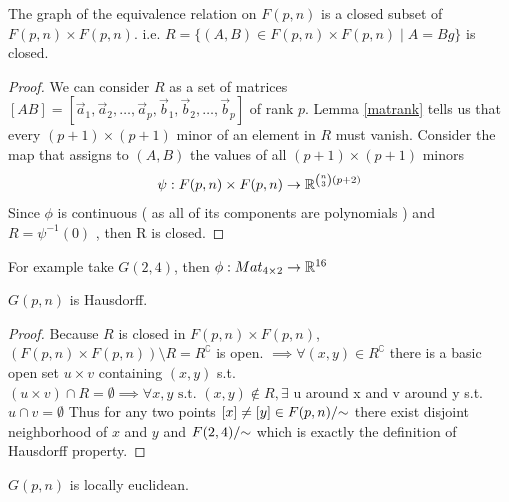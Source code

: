 \documentclass[11pt,a4paper]{report}
\begin{document}
\begin{Prop}
The graph of the equivalence relation on $F(p,n)$ is a closed subset of $F(p,n) \times F(p,n)$. i.e. $ R = \{ (A,B) \in F(p,n) \times F(p,n) \; | \; A = Bg \}$ is closed.
\end{Prop}
\begin{proof}
We can consider $R$ as a set of matrices $[A B] = [\vec{a}_1, \vec{a}_2, \dots, \vec{a}_p, \vec{b}_1, \vec{b}_2, \dots , \vec{b}_p]$ of rank $p$.
Lemma \ref{matrank} tells us that every $(p+1) \times (p+1) $ minor of an element in $R$ must vanish. Consider the map that assigns to $(A,B)$ the values of all $ (p+1) \times (p+1) $ minors
$$ \psi:  F(p,n) \times F(p,n) \to \mathbb{R}^{ {n \choose 3} (p+2) }$$
Since $\phi$ is continuous ( as all of its components are polynomials )  and $R = \psi^{-1} (0) $ , then R is closed.
\end{proof}
\begin{Ex}
    For example take $G(2,4)$, then $\phi: Mat_{4 \times 2} \to \mathbb{R}^{16}$ 
\end{Ex}
\begin{Prop}\label{HausP}
$G(p,n)$ is Hausdorff.
\end{Prop}
\begin{proof}
Because $R$ is closed in $F(p,n) \times F(p,n)$, $(F(p,n) \times F(p,n)) \setminus R = R^{\complement}$ is open.
$\implies \forall (x,y) \in R^{\complement} $ there is a basic open set $u \times v$ containing $(x,y)$ s.t. $ (u \times v) \cap R = \emptyset 
\implies \forall x, y \text{ s.t. } (x,y) \not\in R, \exists$ u around x and v around y s.t. $u \cap v = \emptyset$
Thus for any two points $[x] \neq [y] \in F(p,n)/{\sim}$ there exist disjoint neighborhood of $x$ and $y$ and $ F(2,4)/{\sim}$ which is exactly the definition of Hausdorff property.
\end{proof}
\begin{Prop}\label{locEc}
   $G(p,n)$ is locally euclidean. 
\end{Prop}
\end{document}

